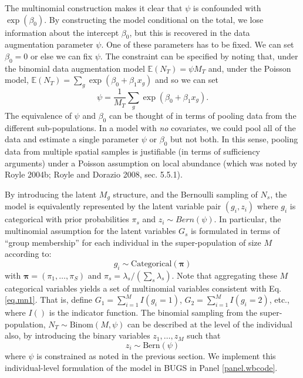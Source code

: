 The multinomial construction makes it clear that $\psi$ is confounded
with $\exp(\beta_{0})$. By constructing the model conditional on the
total, we lose information about the intercept $\beta_{0}$, but this
is recovered in the data augmentation parameter $\psi$.  One of these
parameters has to be fixed. We can set $\beta_0 = 0$ or else we can
fix $\psi$.  The constraint can be specified by noting that, under the
binomial data augmentation model $\mathbb{E}(N_{T}) = \psi M_{T}$ and, under the
Poisson model, $\mathbb{E}(N_{T}) = \sum_{g} \exp(\beta_{0} + \beta_{1} x_{g})$
and so we can set
\[
 \psi = \frac{1}{M_{T}} \sum_{g} \exp(\beta_{0} + \beta_{1} x_{g}).
\]
The equivalence of $\psi$ and $\beta_{0}$ can be thought of in terms of pooling data
from the different sub-populations. In a model with {\it no} covariates, 
we could pool 
all of the data and estimate a single parameter $\psi$ or $\beta_0$ but not
both. In this sense, 
 pooling data from multiple spatial samples is justifiable (in terms of
sufficiency arguments) under a Poisson assumption on local abundance
(which was noted by Royle 2004b; Royle and Dorazio 2008, sec. 5.5.1).


By introducing the latent $M_{g}$ structure, and the Bernoulli
sampling of $N_{s}$, the model is equivalently represented by the
latent variable pair $(g_{i},z_{i})$ where $g_{i}$ is categorical with
prior probabilities $\pi_{s}$ and $z_{i} \sim Bern(\psi)$.  In
particular, the multinomial assumption for the latent variables
$G_{s}$ is formulated in terms of ``group membership'' for each
individual in the super-population of size $M$ according to:
\[
 g_{i} \sim \mbox{Categorical}\left( {\bm \pi} \right)
\]
with ${\bm \pi} = (\pi_{1}, \ldots, \pi_{S})$ and $\pi_{s} =
\lambda_{s}/(\sum_{s} \lambda_{s})$.  Note that aggregating these $M$
categorical variables yields a set of multinomial variables consistent
with Eq. \ref{eq.mn1}. That is, define $G_{1} = \sum_{i=1}^{M} I(g_{i}
= 1)$, $G_{2} = \sum_{i=1}^{M} I(g_{i} = 2)$, etc., where $I()$ is the
indicator function.  The binomial sampling from the super-population,
$N_{T} \sim \mbox{Binom}(M, \psi)$
can be described at the level of the individual also, 
 by introducing the binary
variables $z_{1},\ldots,z_{M}$ such that
\[
 z_{i} \sim \mbox{Bern}(\psi)
\]
where $\psi$ is constrained as noted in the previous section. 
We implement this individual-level formulation of the model in BUGS in
Panel \ref{panel.wbcode}.


